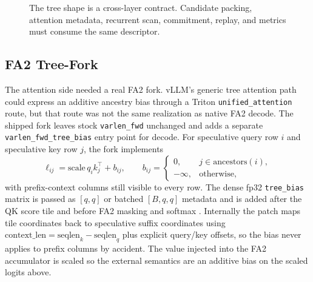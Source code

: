 \documentclass[conference]{IEEEtran}
\newcommand{\code}[1]{\texttt{#1}}
\begin{document}
\begin{figure}[t]
\centering
{}
\caption{The tree shape is a cross-layer contract. Candidate packing, attention metadata, recurrent scan, commitment, replay, and metrics must consume the same descriptor.}
\label{fig:pipeline}
\end{figure}

\subsection{FA2 Tree-Fork}

The attention side needed a real FA2 fork. vLLM's generic tree attention path could express an additive ancestry bias through a Triton \code{unified\_attention} route, but that route was not the same realization as native FA2 decode. The shipped fork leaves stock \code{varlen\_fwd} unchanged and adds a separate \code{varlen\_fwd\_tree\_bias} entry point for decode. For speculative query row \(i\) and speculative key row \(j\), the fork implements
\begin{equation}
\ell_{ij} = \mathrm{scale}\, q_i k_j^\top + b_{ij}, \qquad
b_{ij} =
\begin{cases}
0, & j \in \mathrm{ancestors}(i),\\
-\infty, & \text{otherwise,}
\end{cases}
\end{equation}
with prefix-context columns still visible to every row. The dense fp32 \code{tree\_bias} matrix is passed as \([q,q]\) or batched \([B,q,q]\) metadata and is added after the QK score tile and before FA2 masking and softmax \cite{dao2023flashattention}. Internally the patch maps tile coordinates back to speculative suffix coordinates using \(\mathrm{context\_len}=\mathrm{seqlen}_k-\mathrm{seqlen}_q\) plus explicit query/key offsets, so the bias never applies to prefix columns by accident. The value injected into the FA2 accumulator is scaled so the external semantics are an additive bias on the scaled logits above.
\end{document}
